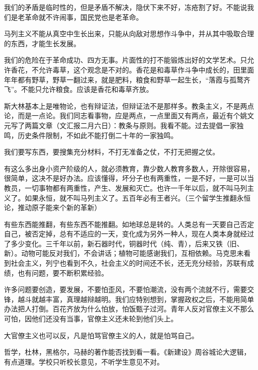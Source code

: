 我们的矛盾是临时性的，但是矛盾不解决，隐伏下来不好，冻疮割了好。不能说我们是老革命就不许闹事，国民党也是老革命。

马列主义不能从真空中生长出来，只能从向敌对思想作斗争中，并从其中吸取合理的东西，才能生长发展。

我们的危险在于革命成功、四方无事。片面性的打不能锻炼出好的文学艺术。只允许香花，不允许毒草，这个观念是不对的。香花是和毒草作斗争中成长的，田里面年年都有野草，野草一翻过来，就是肥料，粮食和野草一起生长，“落霞与孤鹜齐飞”。不能只允许粮食。应该是香花和毒草齐放。

斯大林基本上是唯物论，也有辩证法，但辩证法不是那样多。教条主义，不是两点论，而是一点论。我们同志看事物，应是两点，一点里面又有两点，最近有个姚文元写了两篇文章（文汇报二月六日）：教条与原则。我看不能。过去提倡一家独鸣，历史条件限制，不如此不能打倒二十年的一家独鸣。

我们要写东西，要搜集充分材料，不打无准备之仗，不打无把握之仗。

有这么多出身小资产阶级的人，就必须教育，靠少数人教育多数人，开除很容易，很简单，这决不是好办法。应该懂得，坏分子也有两重性，一是不好，一是可以当教员，一切事物都有两重性，产生、发展和灭亡。也许一千年以后，就不叫马列主义了。如果永恒，就不叫马列主义了。五百年必有王者兴。（三个留学生推翻永恒论，推动原子能来个新的革新）

有些东西能推翻，有些东西不能推翻。如地球总是转的。人类总有一天要自己否定自己，被否定掉，总有不适应的一天，变化成为另外一种人，现在人类本身就经过了多少变化。三千年以前，新石器时代，铜器时代（纯、青），后来又铁（旧、新）。动物可能反对我们，不会讲话；植物可能感谢我们，互相依赖。马克思未看到社会主义，列宁也看到不久，社会主义的时间还不长，还无充分经验，苏联有成绩，也有问题，要不断积累经验。

许多问题要创造，要发展，不要怕歪风，不要怕潮流，没有两个流就不行，需要交锋，越斗就越丰富，真理越辩越明。我们应特别想到，掌握政权之后，不能用简单办法把人打倒。百花齐放为什么怕放，怕饭甄子过河。青年人反对官僚主义不那么可怕，因他们还没有当事，官僚主义还未轮到他们头上。

大官僚主义也可以反，凡是怕骂官僚主义的人，就是怕骂自己。

哲学，杜林，黑格尔，马赫的著作能否找到看一看。《新建设》周谷城论大逻辑，有点道理。学校只听校长意见，不听学生意见不对。


